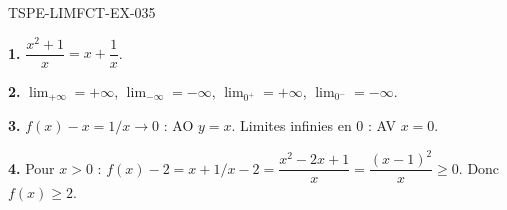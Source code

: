 \begin{corrige}{TSPE-LIMFCT-EX-035}

\textbf{1.} $\dfrac{x^2+1}{x} = x + \dfrac{1}{x}$.

\textbf{2.} $\lim_{+\infty} = +\infty$, $\lim_{-\infty} = -\infty$, $\lim_{0^+} = +\infty$, $\lim_{0^-} = -\infty$.

\textbf{3.} $f(x) - x = 1/x \to 0$ : AO $y = x$. Limites infinies en $0$ : AV $x = 0$.

\textbf{4.} Pour $x > 0$ : $f(x) - 2 = x + 1/x - 2 = \dfrac{x^2-2x+1}{x} = \dfrac{(x-1)^2}{x} \geq 0$. Donc $f(x) \geq 2$.

\end{corrige}
